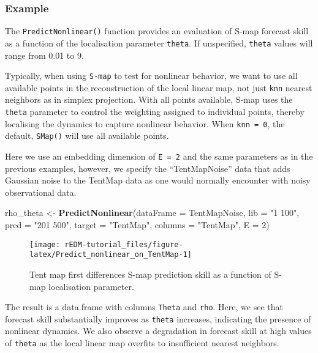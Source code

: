 \documentclass[]{article}
\newenvironment{Shaded}{\begin{snugshade}}{\end{snugshade}}
\newcommand{\DataTypeTok}[1]{\textcolor[rgb]{0.13,0.29,0.53}{#1}}
\newcommand{\DecValTok}[1]{\textcolor[rgb]{0.00,0.00,0.81}{#1}}
\newcommand{\KeywordTok}[1]{\textcolor[rgb]{0.13,0.29,0.53}{\textbf{#1}}}
\newcommand{\NormalTok}[1]{#1}
\newcommand{\StringTok}[1]{\textcolor[rgb]{0.31,0.60,0.02}{#1}}
\begin{document}
\hypertarget{example-2}{%
\subsubsection{Example}\label{example-2}}

The \texttt{PredictNonlinear()} function provides an evaluation of S-map
forecast skill as a function of the localisation parameter
\texttt{theta}. If unspecified, \texttt{theta} values will range from
0.01 to 9.

Typically, when using \texttt{S-map} to test for nonlinear behavior, we
want to use all available points in the reconstruction of the local
linear map, not just \texttt{knn} nearest neighbors as in simplex
projection. With all points available, S-map uses the \texttt{theta}
parameter to control the weighting assigned to individual points,
thereby localising the dynamics to capture nonlinear behavior. When
\texttt{knn\ =\ 0}, the default, \texttt{SMap()} will use all available
points.

Here we use an embedding dimension of \texttt{E\ =\ 2} and the same
parameters as in the previous examples, however, we specify the
``TentMapNoise'' data that adds Gaussian noise to the TentMap data as
one would normally encounter with noisy observational data.

\begin{Shaded}
\begin{Highlighting}[]
\NormalTok{rho_theta <-}\StringTok{ }\KeywordTok{PredictNonlinear}\NormalTok{(}\DataTypeTok{dataFrame =}\NormalTok{ TentMapNoise, }\DataTypeTok{lib =} \StringTok{"1 100"}\NormalTok{, }\DataTypeTok{pred =} \StringTok{"201 500"}\NormalTok{, }
    \DataTypeTok{target =} \StringTok{"TentMap"}\NormalTok{, }\DataTypeTok{columns =} \StringTok{"TentMap"}\NormalTok{, }\DataTypeTok{E =} \DecValTok{2}\NormalTok{)}
\end{Highlighting}
\end{Shaded}

\begin{figure}[h]

{\centering \texttt{[image: rEDM-tutorial\_files/figure-latex/Predict\_nonlinear\_on\_TentMap-1]} 

}

\caption{Tent map first differences S-map prediction skill as a function of S-map localisation parameter.}\label{fig:Predict_nonlinear_on_TentMap}
\end{figure}

The result is a data.frame with columns \texttt{Theta} and \texttt{rho}.
Here, we see that forecast skill substantially improves as
\texttt{theta} increases, indicating the presence of nonlinear dynamics.
We also observe a degradation in forecast skill at high values of
\texttt{theta} as the local linear map overfits to insufficient nearest
neighbors.
\end{document}

